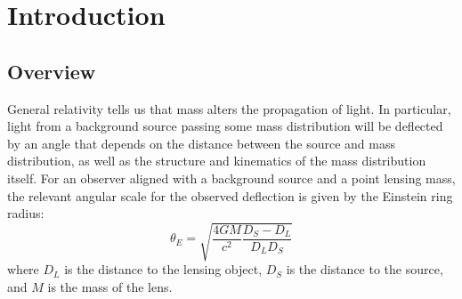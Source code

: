 \documentclass[12pt,preprint]{aastex}
\newcommand{\apwsim}{\raisebox{0.2ex}{\scriptsize$\sim$\normalsize}}
\begin{document}
\begin{abstract}
[APW: update the abstract..]
Many current photometric, time-domain surveys are driven by specific goals, such as supernova searches, transiting exoplanet discoveries, or stellar variability studies, which set the cadence with which individual fields get re-imaged. In the case of the Palomar Transient Factory (PTF), several such sub-surveys are being conducted in parallel, leading to an extremely non-uniform sampling gradient over the survey footprint of nearly 20,000 deg$^2$: while the typical 7.26~deg$^2$ PTF field has been imaged 15 times, \apwsim1000~deg$^2$ of the survey has been observed more than 150 times. We use the existing PTF data to study the trade-off between a large survey footprint and irregular sampling when searching for microlensing events, and to examine the probability that such events can be recovered in these data. We conduct Monte Carlo simulations to evaluate our detection efficiency in a hypothetical survey field as a function of both the baseline and number of observations. We also apply variability statistics to systematically differentiate between periodic, transient, and flat light curves. Preliminary results suggest that both recovery and discovery of microlensing events are possible with a careful consideration of photometric systematics. This work can help inform predictions about the observability of microlensing signals in future wide-field time-domain surveys such as that of LSST.
	
\end{abstract}


\section{Introduction}

\subsection{Overview}
General relativity tells us that mass alters the propagation of light. In particular, light from a background source passing some mass distribution will be deflected by an angle that depends on the distance between the source and mass distribution, as well as the structure and kinematics of the mass distribution itself. For an observer aligned with a background source and a point lensing mass, the relevant angular scale for the observed deflection is given by the Einstein ring radius:
\begin{equation} \label{eq:einstein_radius}
	\theta_E = \sqrt{\frac{4GM}{c^2}\frac{D_{S} - D_L}{D_L D_S}}
\end{equation}
where $D_L$ is the distance to the lensing object, $D_S$ is the distance to the source, and $M$ is the mass of the lens. 
\end{document}
